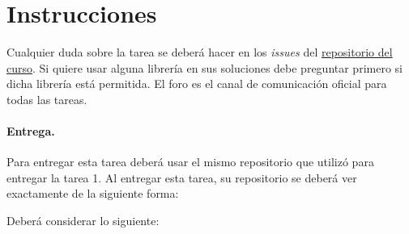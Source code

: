 
\section*{Instrucciones}

Cualquier duda sobre la tarea se deberá hacer en los \emph{issues} del \href{https://github.com/UC-IIC3253/2022}{repositorio del curso}. Si quiere usar alguna librería en sus soluciones debe preguntar primero si dicha librería está permitida. El foro es el canal de comunicación oficial para todas las tareas.

\paragraph{Entrega.} Para entregar esta tarea deberá usar el mismo repositorio que utilizó para entregar la tarea 1. Al entregar esta tarea, su repositorio se deberá ver exactamente de la siguiente forma:

\bigskip


\bigskip

Deberá considerar lo siguiente:

